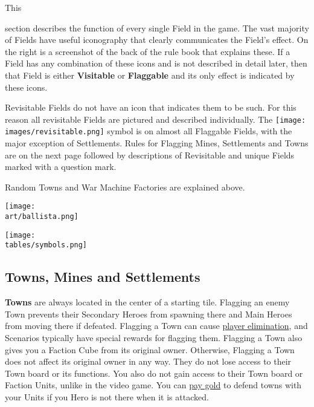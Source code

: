 
\begin{multicols*}{2}

\hypertarget{All}{This} section describes the function of every single Field in the game.
The vast majority of Fields have useful iconography that clearly communicates the Field's effect.
On the right is a screenshot of the back of the rule book that explains these.
If a Field has any combination of these icons and is not described in detail later, then that Field is either \textbf{Visitable} or \textbf{Flaggable} and its only effect is indicated by these icons.\par
Revisitable Fields do not have an icon that indicates them to be such.
For this reason all revisitable Fields are pictured and described individually.
The \texttt{[image: \\images/revisitable.png]} symbol is on almost all Flaggable Fields, with the major exception of Settlements.
Rules for Flagging Mines, Settlements and Towns are on the next page followed by descriptions of Revisitable and unique Fields marked with a question mark.\par
Random Towns and War Machine Factories are explained above.

\vfill
\begin{center}
  \hspace{-14em}
  \texttt{[image: \\art/ballista.png]}
\end{center}

\begin{center}
  \texttt{[image: \\tables/symbols.png]}
\end{center}

\clearpage
\subsection*{Towns, Mines and Settlements}
\textbf{Towns} are always located in the center of a starting tile.
Flagging an enemy Town prevents their Secondary Heroes from spawning there and Main Heroes from moving there if defeated.
Flagging a Town can cause \hyperlink{End}{player elimination}, and Scenarios typically have special rewards for flagging them.
Flagging a Town also gives you a Faction Cube from its original owner.
Otherwise, Flagging a Town does not affect its original owner in any way.
They do not lose access to their Town board or its functions.
You also do not gain access to their Town board or Faction Units, unlike in the video game.
You can \hyperlink{Town}{pay gold} to defend towns with your Units if you Hero is not there when it is attacked.


\end{multicols*}
